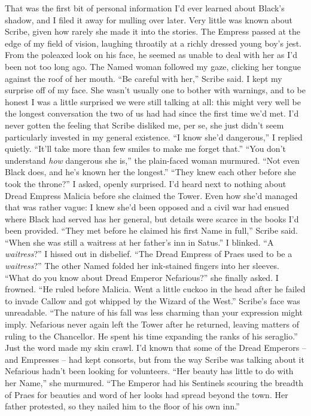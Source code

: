 \documentclass[12pt, openany]{book}
\begin{document}
That was the first bit of personal information I’d ever learned about Black’s shadow, and I filed it away for mulling over later. Very little was known about Scribe, given how rarely she made it into the stories. The Empress passed at the edge of my field of vision, laughing throatily at a richly dressed young boy’s jest. From the poleaxed look on his face, he seemed as unable to deal with her as I’d been not too long ago. The Named woman followed my gaze, clicking her tongue against the roof of her mouth.
“Be careful with her,” Scribe said.
I kept my surprise off of my face. She wasn’t usually one to bother with warnings, and to be honest I was a little surprised we were still talking at all: this might very well be the longest conversation the two of us had had since the first time we’d met. I’d never gotten the feeling that Scribe disliked me, per se, she just didn’t seem particularly invested in my general existence.
“I know she’d dangerous,” I replied quietly. “It’ll take more than few smiles to make me forget that.”
“You don’t understand \textit{how} dangerous she is,” the plain-faced woman murmured. “Not even Black does, and he’s known her the longest.”
“They knew each other before she took the throne?” I asked, openly surprised.
I’d heard next to nothing about Dread Empress Malicia before she claimed the Tower. Even how she’d managed that was rather vague: I knew she’d been opposed and a civil war had ensued where Black had served has her general, but details were scarce in the books I’d been provided.
“They met before he claimed his first Name in full,” Scribe said. “When she was still a waitress at her father’s inn in Satus.”
I blinked. “A \textit{waitress}?” I hissed out in disbelief. “The Dread Empress of Praes used to be a \textit{waitress}?”
The other Named folded her ink-stained fingers into her sleeves.
“What do you know about Dread Emperor Nefarious?” she finally asked.
I frowned. “He ruled before Malicia. Went a little cuckoo in the head after he failed to invade Callow and got whipped by the Wizard of the West.”
Scribe’s face was unreadable. “The nature of his fall was less charming than your expression might imply. Nefarious never again left the Tower after he returned, leaving matters of ruling to the Chancellor. He spent his time expanding the ranks of his seraglio.”
Just the word made my skin crawl. I’d known that some of the Dread Emperors – and Empresses – had kept consorts, but from the way Scribe was talking about it Nefarious hadn’t been looking for volunteers.
“Her beauty has little to do with her Name,” she murmured. “The Emperor had his Sentinels scouring the breadth of Praes for beauties and word of her looks had spread beyond the town. Her father protested, so they nailed him to the floor of his own inn.”
\end{document}
